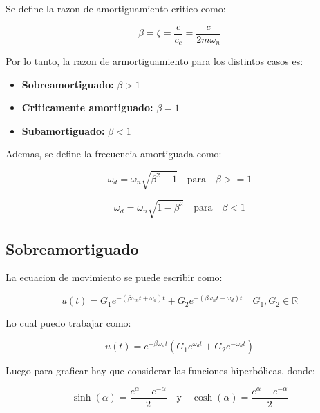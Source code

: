 \documentclass{article}  %
\begin{document}
Se define la razon de amortiguamiento critico como:

\begin{equation}
    \beta = \zeta = \frac{c}{c_c} = \frac{c}{2m\omega_n}
\end{equation}

Por lo tanto, la razon de armortiguamiento para los distintos casos es:

\begin{itemize}
    \item \textbf{Sobreamortiguado:} $\beta > 1$
    \item \textbf{Criticamente amortiguado:} $\beta = 1$
    \item \textbf{Subamortiguado:} $\beta < 1$
\end{itemize}

Ademas, se define la frecuencia amortiguada como:

\begin{equation}
    \omega_d = \omega_n \sqrt{\beta^2 - 1} \quad \text{para} \quad \beta >= 1
\end{equation}

\begin{equation}
    \omega_d = \omega_n \sqrt{1 - \beta^2} \quad \text{para} \quad \beta < 1
\end{equation}
\subsection{Sobreamortiguado}

La ecuacion de movimiento se puede escribir como:

\begin{equation}
    u(t) = G_1 e^{-(\beta \omega_n t + \omega_d)t} + G_2 e^{-(\beta \omega_n t - \omega_d)t} \quad G_1, G_2 \in \mathbb{R}
\end{equation}

Lo cual puedo trabajar como:

\begin{equation}
    u(t) = e^{-\beta \omega_n t} (G_1 e^{\omega_d t} + G_2 e^{-\omega_d t}) 
\end{equation}

Luego para graficar hay que considerar las funciones hiperbólicas, donde:

\begin{equation}
    \sinh(\alpha) = \frac{e^{\alpha} - e^{-\alpha}}{2} \quad \text{y} \quad \cosh(\alpha) = \frac{e^{\alpha} + e^{-\alpha}}{2}
\end{equation}
\end{document}

